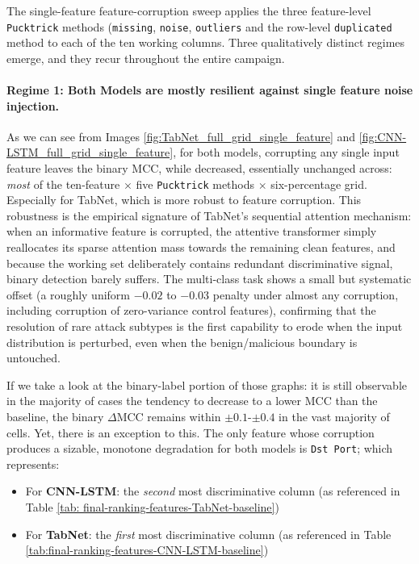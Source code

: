 \documentclass[../main.tex]{subfiles}
\begin{document}
The single-feature feature-corruption sweep applies the three feature-level \texttt{Pucktrick} methods (\texttt{missing}, \texttt{noise}, \texttt{outliers} and the row-level \texttt{duplicated} method to each of the ten working columns. Three qualitatively distinct regimes emerge, and they recur throughout the entire campaign.

\paragraph{Regime 1: Both Models are mostly resilient against single feature noise injection.}
As we can see from Images \ref{fig:TabNet_full_grid_single_feature} and \ref{fig:CNN-LSTM_full_grid_single_feature}, for both models, corrupting any single input feature leaves the binary MCC, while decreased, essentially unchanged across: \emph{most} of the ten-feature $\times$ five \texttt{Pucktrick} methods $\times$ six-percentage grid. Especially for TabNet, which is more robust to feature corruption. This robustness is the empirical signature of TabNet's sequential attention mechanism: when an informative feature is corrupted, the attentive transformer simply reallocates its sparse attention mass towards the remaining clean features, and because the working set deliberately contains redundant discriminative signal, binary detection barely suffers. The multi-class task shows a small but systematic offset (a roughly uniform $-0.02$ to $-0.03$ penalty under almost any corruption, including corruption of zero-variance control features), confirming that the resolution of rare attack subtypes is the first capability to erode when the input distribution is perturbed, even when the benign/malicious boundary is untouched.

If we take a look at the binary-label portion of those graphs: it is still observable in the majority of cases the tendency to decrease to a lower MCC than the baseline, the binary $\Delta\mathrm{MCC}$ remains within $\pm 0.1$-$\pm 0.4$ in the vast majority of cells. Yet, there is an exception to this. The only feature whose corruption produces a sizable, monotone degradation for both models is \texttt{Dst Port}; which represents:
\begin{itemize}
    \item For \textbf{CNN-LSTM}: the \emph{second} most discriminative column (as referenced in Table \ref{tab: final-ranking-features-TabNet-baseline})
    \item For \textbf{TabNet}: the \emph{first} most discriminative column (as referenced in Table \ref{tab:final-ranking-features-CNN-LSTM-baseline})
\end{itemize}
\end{document}
